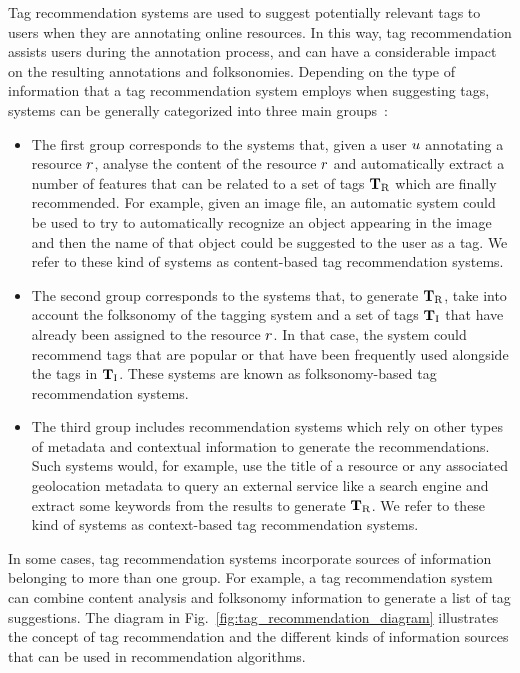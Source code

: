 Tag recommendation systems are used to suggest potentially relevant tags to users when they are annotating online resources. In this way, tag recommendation assists users during the annotation process, and can have a considerable impact on the resulting annotations and folksonomies. 
Depending on the type of information that a tag recommendation system employs when suggesting tags, systems can be generally categorized into three main groups~\citep{Wang2012}:
\begin{itemize}
\item The first group  corresponds to the systems that, given a user $u$ annotating a resource $r$, analyse the content of the resource $r$ and automatically extract a number of features that can be related to a set of tags $\mathbf{T}_{\text{R}}$ which are finally recommended. 
For example, given an image file, an automatic system could be used to try to automatically recognize an object appearing in the image and then the name of that object could be suggested to the user as a tag. We refer to these kind of systems as content-based tag recommendation systems.

\item The second group corresponds to the systems that, to generate $\mathbf{T}_{\text{R}}$, take into account the folksonomy of the tagging system and a set of tags $\mathbf{T}_{\text{I}}$ that have already been assigned to the resource $r$. In that case, the system could recommend tags that are popular or that have been frequently used alongside the tags in $\mathbf{T}_{\text{I}}$. These systems are known as folksonomy-based tag recommendation systems.

\item The third group includes recommendation systems which rely on other types of metadata and contextual information to generate the recommendations. Such systems would, for example, use the title of a resource or any associated geolocation metadata to query an external service like a search engine and extract some keywords from the results to generate $\mathbf{T}_{\text{R}}$. We refer to these kind of systems as context-based tag recommendation systems.
\end{itemize}

In some cases, tag recommendation systems incorporate sources of information belonging to more than one group.
For example, a tag recommendation system can combine content analysis and folksonomy information to generate a list of tag suggestions.
The diagram in Fig.~\ref{fig:tag_recommendation_diagram} illustrates the concept of tag recommendation and the different kinds of information sources that can be used in recommendation algorithms.


